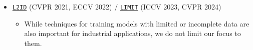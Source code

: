\documentclass{article}
\begin{document}
\begin{itemize}
    \item
    \href{https://l2id.github.io/l2id2022/}{\texttt{L2ID}} (CVPR 2021, ECCV 2022) / 
    \href{https://hirokatsukataoka16.github.io/CVPR-2024-LIMIT}{\texttt{LIMIT}} (ICCV 2023, CVPR 2024) 
    \begin{itemize}
        \item While techniques for training models with limited or incomplete data are also important for industrial applications, we do not limit our focus to them.
    \end{itemize}


\end{itemize}
\end{document}

